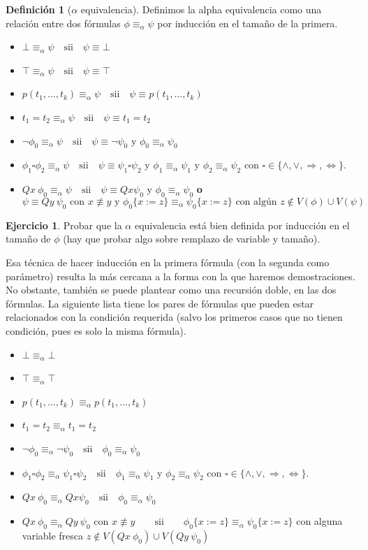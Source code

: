 \documentclass[a4paper, 12pt]{report}
\newcommand{\Ra}{\Rightarrow}
\newcommand{\te}{\text}
\newcommand{\Lra}{\Leftrightarrow}
\theoremstyle{definition}
\newtheorem{definicion}[teorema]{Definición}
\newtheorem{ejercicio}{Ejercicio}[section]
\begin{document}
\begin{definicion}[$\alpha$ equivalencia]
	Definimos la alpha equivalencia como una relación entre dos fórmulas $\phi\equiv_\alpha\psi$ por inducción en el tamaño de la primera.
	\begin{itemize}
		\item $\bot\equiv_\alpha\psi \quad\te{sii}\quad \psi\equiv\bot$
		\item $\top\equiv_\alpha\psi \quad\te{sii}\quad \psi\equiv\top$
		\item $p(t_1,\dots,t_k)\equiv_\alpha\psi \quad\te{sii}\quad\psi\equiv p(t_1,\dots,t_k)$
		\item $t_1=t_2\equiv_\alpha\psi \quad\te{sii}\quad\psi\equiv t_1=t_2$
		\item $\lnot\phi_0\equiv_\alpha\psi \quad\te{sii}\quad \psi\equiv\lnot\psi_0$ y $\phi_0\equiv_\alpha\psi_0$
		\item $\phi_1\square\phi_2\equiv_\alpha\psi \quad\te{sii}\quad \psi\equiv\psi_1\square\psi_2$ y $\phi_1\equiv_\alpha\psi_1$ y $\phi_2\equiv_\alpha\psi_2$ \quad con $\square\in\{\wedge,\vee,\Ra,\Lra\}$.
		\item $Qx~\phi_0\equiv_\alpha\psi \quad\te{sii}\quad
			\psi\equiv Qx\psi_0\te{ y }\phi_0\equiv_\alpha\psi_0$ \textbf{o}
		$$\psi\equiv Qy~\psi_0\te{ con }x\not\equiv y\te{ y }\phi_0\{x:=z\}\equiv_\alpha\psi_0\{x:=z\}\te{ con algún }z\not\in V(\phi)\cup V(\psi)
		 $$
	\end{itemize}
\end{definicion}
\begin{ejercicio}
	Probar que la $\alpha$ equivalencia está bien definida por inducción en el tamaño de $\phi$ (hay que probar algo sobre remplazo de variable y tamaño).
\end{ejercicio}
Esa técnica de hacer inducción en la primera fórmula (con la segunda como parámetro) resulta la más cercana a la forma con la que haremos demostraciones. No obstante, también se puede plantear como una recursión doble, en las dos fórmulas. La siguiente lista tiene los pares de fórmulas que pueden estar relacionados con la condición requerida (salvo los primeros casos que no tienen condición, pues es solo la misma fórmula).
\begin{itemize}
	\item $\bot\equiv_\alpha\bot$
	\item $\top\equiv_\alpha\top$
	\item $p(t_1,\dots,t_k)\equiv_\alpha p(t_1,\dots,t_k)$
	\item $t_1=t_2\equiv_\alpha t_1=t_2$
	\item $\lnot\phi_0\equiv_\alpha\lnot\psi_0 \quad\te{sii}\quad \phi_0\equiv_\alpha\psi_0$
	\item $\phi_1\square\phi_2\equiv_\alpha\psi_1\square\psi_2 \quad\te{sii}\quad \phi_1\equiv_\alpha\psi_1$ y $\phi_2\equiv_\alpha\psi_2$ \quad con $\square\in\{\wedge,\vee,\Ra,\Lra\}$.
	\item $Qx~\phi_0\equiv_\alpha  Qx\psi_0 \quad\te{sii}\quad
    \phi_0\equiv_\alpha\psi_0$ 
	\item $Qx~\phi_0\equiv_\alpha Qy~\psi_0\te{ con }x\not\equiv y \qquad\te{sii}\qquad\phi_0\{x:=z\}\equiv_\alpha\psi_0\{x:=z\}$ con alguna variable fresca  $z\not\in V(Qx~\phi_0)\cup V(Qy~\psi_0)
	$
\end{itemize}
\end{document}
